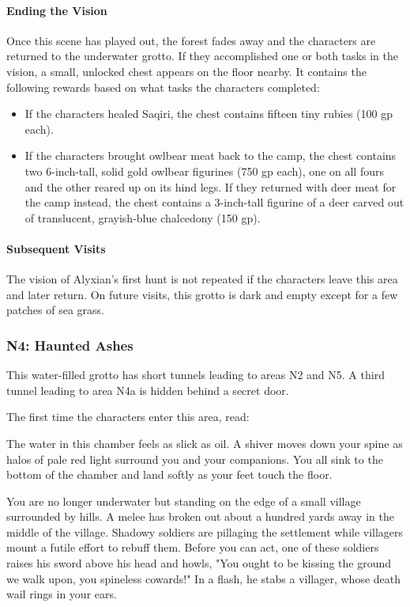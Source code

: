 \documentclass[10pt,a4paper,twoside,bg=print,twocolumn,openany,nodeprecatedcode]{dndbook}
\begin{document}
\paragraph{Ending the Vision}
Once this scene has played out, the forest fades away and the characters are returned to the underwater grotto. If they accomplished one or both tasks in the vision, a small, unlocked chest appears on the floor nearby. It contains the following rewards based on what tasks the characters completed:


\begin{itemize}
\item If the characters healed Saqiri, the chest contains fifteen tiny rubies (100 gp each).
\item If the characters brought owlbear meat back to the camp, the chest contains two 6-inch-tall, solid gold owlbear figurines (750 gp each), one on all fours and the other reared up on its hind legs. If they returned with deer meat for the camp instead, the chest contains a 3-inch-tall figurine of a deer carved out of translucent, grayish-blue chalcedony (150 gp).
\end{itemize}

\paragraph{Subsequent Visits}
The vision of Alyxian's first hunt is not repeated if the characters leave this area and later return. On future visits, this grotto is dark and empty except for a few patches of sea grass.

\subsubsection{N4: Haunted Ashes}
This water-filled grotto has short tunnels leading to areas N2 and N5. A third tunnel leading to area N4a is hidden behind a secret door.

The first time the characters enter this area, read:

\begin{DndReadAloud}{}
The water in this chamber feels as slick as oil. A shiver moves down your spine as halos of pale red light surround you and your companions. You all sink to the bottom of the chamber and land softly as your feet touch the floor.

You are no longer underwater but standing on the edge of a small village surrounded by hills. A melee has broken out about a hundred yards away in the middle of the village. Shadowy soldiers are pillaging the settlement while villagers mount a futile effort to rebuff them. Before you can act, one of these soldiers raises his sword above his head and howls, "You ought to be kissing the ground we walk upon, you spineless cowards!" In a flash, he stabs a villager, whose death wail rings in your ears.

\end{DndReadAloud}
\end{document}
